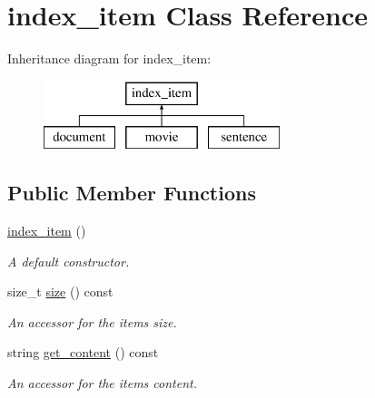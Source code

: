 \hypertarget{classindex__item}{}\section{index\+\_\+item Class Reference}
\label{classindex__item}
Inheritance diagram for index\+\_\+item\+:\begin{figure}[H]
\begin{center}
\leavevmode
\includegraphics[height=2.000000cm]{classindex__item}
\end{center}
\end{figure}
\subsection*{Public Member Functions}
\begin{DoxyCompactItemize}
\item 
\mbox{\label{classindex__item_a26948d7ad5975fe8160fdedb58df9904}} 
\hyperlink{classindex__item_a26948d7ad5975fe8160fdedb58df9904}{index\+\_\+item} ()
\begin{DoxyCompactList}\small\item\em A default constructor. \end{DoxyCompactList}\item 
size\+\_\+t \hyperlink{classindex__item_a16fbb1fcb7c9296afd03eaed51175935}{size} () const
\begin{DoxyCompactList}\small\item\em An accessor for the item\textquotesingle{}s size. \end{DoxyCompactList}\item 
string \hyperlink{classindex__item_ae95390ac357a5e10b6c1335a49d91e83}{get\+\_\+content} () const
\begin{DoxyCompactList}\small\item\em An accessor for the item\textquotesingle{}s content. \end{DoxyCompactList}\end{DoxyCompactItemize}
